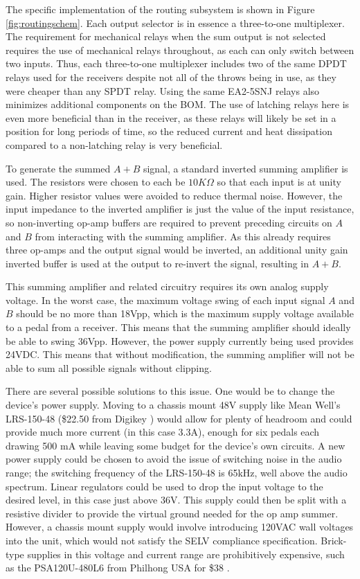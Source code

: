 \documentclass{article}
\begin{document}
	The specific implementation of the routing subsystem is shown in Figure \ref{fig:routingschem}.  Each output selector is in essence a three-to-one multiplexer.  The requirement for mechanical relays when the sum output is not selected requires the use of mechanical relays throughout, as each can only switch between two inputs.  Thus, each three-to-one multiplexer includes two of the same DPDT relays used for the receivers despite not all of the throws being in use, as they were cheaper than any SPDT relay.  Using the same EA2-5SNJ relays also minimizes additional components on the BOM.  The use of latching relays here is even more beneficial than in the receiver, as these relays will likely be set in a position for long periods of time, so the reduced current and heat dissipation compared to a non-latching relay is very beneficial.

	To generate the summed $A+B$ signal, a standard inverted summing amplifier is used.  The resistors were chosen to each be $10K\Omega$ so that each input is at unity gain.  Higher resistor values were avoided to reduce thermal noise.  However, the input impedance to the inverted amplifier is just the value of the input resistance, so non-inverting op-amp buffers are required to prevent preceding circuits on $A$ and $B$ from interacting with the summing amplifier.  As this already requires three op-amps and the output signal would be inverted, an additional unity gain inverted buffer is used at the output to re-invert the signal, resulting in $A+B$.

	This summing amplifier and related circuitry requires its own analog supply voltage.  In the worst case, the maximum voltage swing of each input signal $A$ and $B$ should be no more than 18Vpp, which is the maximum supply voltage available to a pedal from a receiver.  This means that the summing amplifier should ideally be able to swing 36Vpp.  However, the power supply currently being used provides 24VDC.  This means that without modification, the summing amplifier will not be able to sum all possible signals without clipping.

	There are several possible solutions to this issue.  One would be to change the device's power supply.  Moving to a chassis mount 48V supply like Mean Well's LRS-150-48 \cite{datasheet:LRS-150-48} (\$22.50 from Digikey \cite{digikey}) would allow for plenty of headroom and could provide much more current (in this case 3.3A), enough for six pedals each drawing 500 mA while leaving some budget for the device's own circuits.  A new power supply could be chosen to avoid the issue of switching noise in the audio range; the switching frequency of the LRS-150-48 is 65kHz, well above the audio spectrum.  Linear regulators could be used to drop the input voltage to the desired level, in this case just above 36V.  This supply could then be split with a resistive divider to provide the virtual ground needed for the op amp summer.  However, a chassis mount supply would involve introducing 120VAC wall voltages into the unit, which would not satisfy the SELV compliance specification.  Brick-type supplies in this voltage and current range are prohibitively expensive, such as the PSA120U-480L6 from Philhong USA for \$38 \cite{digikey}.
\end{document}
